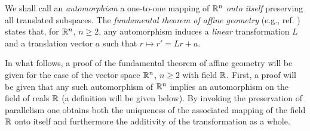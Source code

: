 We shall call an {\em automorphism}
a one-to-one mapping of ${\Bbb R}^n$ {\em onto itself} preserving all translated
subspaces.
The {\em fundamental theorem of affine geometry}
(e.g., ref. \cite[Theorem 5]{Gruenberg-77}) states that, for
${\Bbb R}^n$,
$n\ge 2$, any automorphism
 induces a
{\em linear} transformation $L$
and a translation vector $a$ such that
$r\mapsto r'=Lr+a$.

In what follows, a proof of the fundamental theorem of affine geometry
will be given for the case of the vector space ${\Bbb R}^n$, $n\ge 2$
with field ${\Bbb R}$.
First, a proof will be given that any such automorphism
of ${\Bbb R}^n$ implies an automorphism on the field of reals ${\Bbb R}$
(a definition will be given below).
By invoking the preservation of parallelism
one obtains both the uniqueness of the associated mapping of the
field ${\Bbb R}$ onto itself and furthermore
the additivity of the transformation as a whole.


